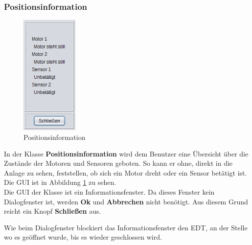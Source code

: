 \subsubsection{Positionsinformation} \label{subsubsec:Positionsinformation}
\begin{figure}
\vspace{-20pt}
  \begin{center}
    \includegraphics[width=0.25\textwidth]{Bilder/GUI/Positionsinformation}
  \end{center}
  \caption{Positionsinformation}
  \label{Positionsinformation}
  \vspace{-10pt}
\end{figure}
In der Klasse \textbf{Positionsinformation} wird dem Benutzer eine Übersicht über die Zustände der Motoren und Sensoren geboten. So kann er ohne, direkt in die Anlage zu sehen, feststellen, ob sich ein Motor dreht oder ein Sensor betätigt ist.
\\ Die \ac{GUI} ist in Abbildung \ref{Positionsinformation} zu sehen.
\\ Die \ac{GUI} der Klasse ist ein Informationsfenster. Da dieses Fenster kein Dialogfenster ist, werden \textbf{Ok} und \textbf{Abbrechen} nicht benötigt. Aus diesem Grund reicht ein Knopf \textbf{Schließen} aus.

\vspace{10pt}

Wie beim Dialogfenster blockiert das Informationsfenster den \ac{EDT}, an der Stelle wo es geöffnet wurde, bis es wieder geschlossen wird.

\vspace{10pt}

